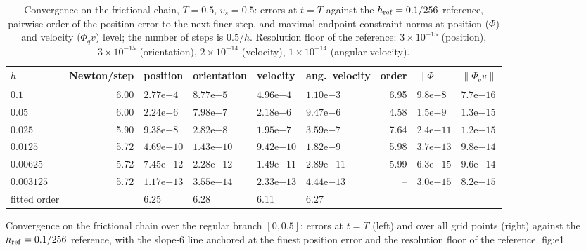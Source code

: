 \begin{table}[!htb]
\centering
\caption{Convergence on the frictional chain, $T=0.5$, $v_s=0.5$: errors at $t=T$ against the
$h_{\rm ref}=0.1/256$ reference, pairwise order of the position error to the next finer step, and
maximal endpoint constraint norms at position ($\Phi$) and velocity ($\Phi_qv$) level; the number of steps is $0.5/h$. Resolution
floor of the reference: $3\times10^{-15}$ (position), $3\times10^{-15}$ (orientation),
$2\times10^{-14}$ (velocity), $1\times10^{-14}$ (angular velocity).}
\label{tab:e1}
\scriptsize
\setlength{\tabcolsep}{2.5pt}
\begin{tabular}{@{}lrllllrll@{}}
\toprule
$h$ & Newton/step & position & orientation & velocity & ang.\ velocity & order & $\|\Phi\|$ & $\|\Phi_qv\|$ \\
\midrule
$0.1$      & 6.00 & $2.77\mathrm{e}{-4}$  & $8.77\mathrm{e}{-5}$  & $4.96\mathrm{e}{-4}$  & $1.10\mathrm{e}{-3}$  & 6.95 & $9.8\mathrm{e}{-8}$  & $7.7\mathrm{e}{-16}$ \\
$0.05$     & 6.00 & $2.24\mathrm{e}{-6}$  & $7.98\mathrm{e}{-7}$  & $2.18\mathrm{e}{-6}$  & $9.47\mathrm{e}{-6}$  & 4.58 & $1.5\mathrm{e}{-9}$  & $1.3\mathrm{e}{-15}$ \\
$0.025$    & 5.90 & $9.38\mathrm{e}{-8}$  & $2.82\mathrm{e}{-8}$  & $1.95\mathrm{e}{-7}$  & $3.59\mathrm{e}{-7}$  & 7.64 & $2.4\mathrm{e}{-11}$ & $1.2\mathrm{e}{-15}$ \\
$0.0125$   & 5.72 & $4.69\mathrm{e}{-10}$ & $1.43\mathrm{e}{-10}$ & $9.42\mathrm{e}{-10}$ & $1.82\mathrm{e}{-9}$  & 5.98 & $3.7\mathrm{e}{-13}$ & $9.8\mathrm{e}{-14}$ \\
$0.00625$  & 5.72 & $7.45\mathrm{e}{-12}$ & $2.28\mathrm{e}{-12}$ & $1.49\mathrm{e}{-11}$ & $2.89\mathrm{e}{-11}$ & 5.99 & $6.3\mathrm{e}{-15}$ & $9.6\mathrm{e}{-14}$ \\
$0.003125$ & 5.72 & $1.17\mathrm{e}{-13}$ & $3.55\mathrm{e}{-14}$ & $2.33\mathrm{e}{-13}$ & $4.44\mathrm{e}{-13}$ & --   & $3.0\mathrm{e}{-15}$ & $8.2\mathrm{e}{-15}$ \\
\midrule
fitted order & & 6.25 & 6.28 & 6.11 & 6.27 & & & \\
\bottomrule
\end{tabular}
\end{table}

{Convergence on the frictional chain over the regular branch $[0,0.5]$: errors at $t=T$ (left) and
over all grid points (right) against the $h_{\rm ref}=0.1/256$ reference, with the slope-6 line
anchored at the finest position error and the resolution floor of the reference.}
{fig:e1}

